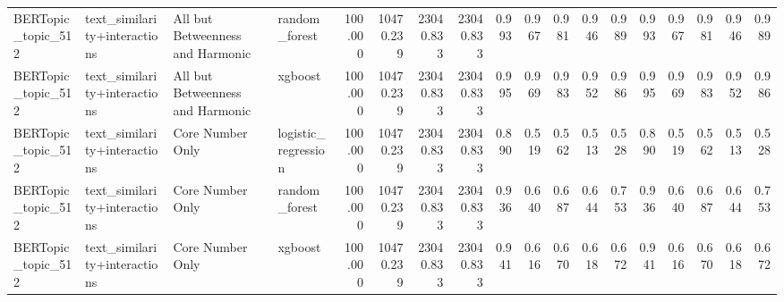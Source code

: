 \begin{tabular}{llllrrrrrrrrrrrrrr}
BERTopic\_topic\_512 & text\_similarity+interactions & All but Betweenness and Harmonic & random\_forest & 100.000 & 10470.239 & 23040.833 & 23040.833 & 0.993 & 0.967 & 0.981 & 0.946 & 0.989 & 0.993 & 0.967 & 0.981 & 0.946 & 0.989 \\
BERTopic\_topic\_512 & text\_similarity+interactions & All but Betweenness and Harmonic & xgboost & 100.000 & 10470.239 & 23040.833 & 23040.833 & 0.995 & 0.969 & 0.983 & 0.952 & 0.986 & 0.995 & 0.969 & 0.983 & 0.952 & 0.986 \\
BERTopic\_topic\_512 & text\_similarity+interactions & Core Number Only & logistic\_regression & 100.000 & 10470.239 & 23040.833 & 23040.833 & 0.890 & 0.519 & 0.562 & 0.513 & 0.528 & 0.890 & 0.519 & 0.562 & 0.513 & 0.528 \\
BERTopic\_topic\_512 & text\_similarity+interactions & Core Number Only & random\_forest & 100.000 & 10470.239 & 23040.833 & 23040.833 & 0.936 & 0.640 & 0.687 & 0.644 & 0.753 & 0.936 & 0.640 & 0.687 & 0.644 & 0.753 \\
BERTopic\_topic\_512 & text\_similarity+interactions & Core Number Only & xgboost & 100.000 & 10470.239 & 23040.833 & 23040.833 & 0.941 & 0.616 & 0.670 & 0.618 & 0.672 & 0.941 & 0.616 & 0.670 & 0.618 & 0.672 \\
\bottomrule
\end{tabular}
